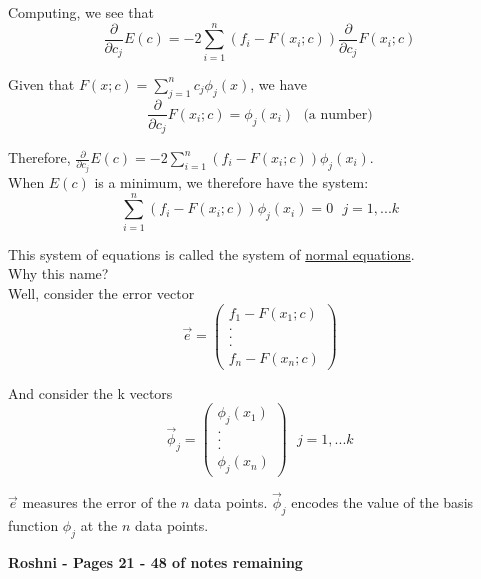 {Computing, we see that
\begin{equation*}
    \frac{\partial}{\partial c_j} E(c) = -2 \sum_{i=1}^{n} (f_i - F(x_i; c)) \frac{\partial}{\partial c_j} F(x_i; c)
\end{equation*}

Given that $F(x; c) = \sum_{j=1}^{n} c_j \phi_j (x)$, we have
\begin{equation*}
    \frac{\partial}{\partial c_j} F(x_i; c) = \phi_j(x_i)~~~\text{(a number)}
\end{equation*}

Therefore, $\frac{\partial}{\partial c_j} E(c) = -2 \sum_{i=1}^{n} (f_i - F(x_i; c)) \phi_j(x_i)$. \\

When $E(c)$ is a minimum, we therefore have the system:
\begin{equation*}
    \sum_{i=1}^{n} (f_i - F(x_i; c)) \phi_j(x_i) = 0~~~j = 1, ... k
\end{equation*}

This system of equations is called the system of \underline{normal equations}.\\

Why this name? \\

Well, consider the error vector
\begin{equation*}
    \vec{e} = \begin{pmatrix} f_1 - F(x_1; c) \\ . \\ . \\ . \\ f_n - F(x_n; c) \end{pmatrix}
\end{equation*}

And consider the k vectors
\begin{equation*}
    \vec{\phi}_j = \begin{pmatrix} \phi_j(x_1) \\ . \\ . \\ . \\ \phi_j(x_n) \end{pmatrix}~~~j = 1, ... k
\end{equation*}

$\vec{e}$ measures the error of the $n$ data points. $\vec{\phi}_j$ encodes the value of the basis function $\phi_j$ at the $n$ data points.
}

\textbf{Roshni - Pages 21 - 48 of notes remaining}